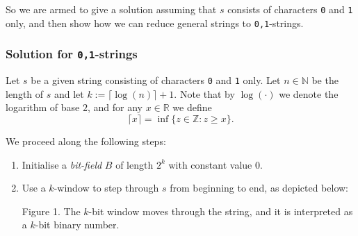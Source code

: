 \documentclass[12pt, a4paper]{amsart}
\begin{document}
So we are armed to give a solution assuming that $s$ consists of characters
{\tt 0} and {\tt 1} only, and then show how we can reduce general strings
to {\tt 0,1}-strings.

\subsubsection{Solution for {\tt 0,1}-strings}\label{bit01}
Let $s$ be a given string consisting of characters {\tt 0} and {\tt 1} only.
Let $n \in \mathbb{N}$ be the length of $s$
and let $k := \lceil \log(n)\rceil+1$. Note that by $\log(\cdot)$ we
denote the logarithm of base $2$, and for any $x\in
\mathbb{R}$ we define
$$\lceil x \rceil = \inf\{z\in \mathbb{Z}: z\geq x\}.$$

We proceed along the following steps:
\begin{enumerate}
\item Initialise a {\em bit-field} $B$ of
length $2^k$ with constant value $0$.
\item Use a $k$-window to step through $s$  from beginning to end,
as depicted below:

\begin{center}
\end{center}
\begin{center}
{\sc Figure 1.} The $k$-bit window moves through the string, and it is
interpreted as a $k$-bit binary number.
\end{center}


\end{enumerate}
\end{document}
